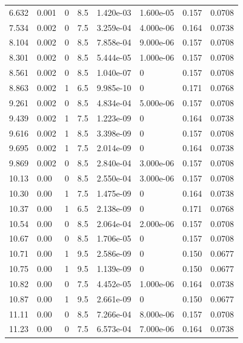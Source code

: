 \documentclass[preview]{standalone}
\begin{document}
{{\begin{tabular}{L{1.2cm}C{1.2cm} C{0.3cm}C{0.5cm} C{1.4cm}C{1.4cm} C{1.4cm}C{1.4cm}}
  6.632  &  0.001  & 0     & 8.5 &  1.420e-03  & 1.600e-05  & 0.157 &  0.0708   \\ 
  7.534  &  0.002  & 0     & 7.5 &  3.259e-04  & 4.000e-06  & 0.164 &  0.0738   \\ 
  8.104  &  0.002  & 0     & 8.5 &  7.858e-04  & 9.000e-06  & 0.157 &  0.0708   \\ 
  8.301  &  0.002  & 0     & 8.5 &  5.444e-05  & 1.000e-06  & 0.157 &  0.0708   \\ 
  8.561  &  0.002  & 0     & 8.5 &  1.040e-07  & 0  & 0.157 &  0.0708   \\ 
  8.863  &  0.002  & 1     & 6.5 &  9.985e-10  & 0  & 0.171 &  0.0768   \\ 
  9.261  &  0.002  & 0     & 8.5 &  4.834e-04  & 5.000e-06  & 0.157 &  0.0708   \\ 
  9.439  &  0.002  & 1     & 7.5 &  1.223e-09  & 0  & 0.164 &  0.0738   \\ 
  9.616  &  0.002  & 1     & 8.5 &  3.398e-09  & 0  & 0.157 &  0.0708   \\ 
  9.695  &  0.002  & 1     & 7.5 &  2.014e-09  & 0  & 0.164 &  0.0738   \\ 
  9.869  &  0.002  & 0     & 8.5 &  2.840e-04  & 3.000e-06  & 0.157 &  0.0708   \\ 
  10.13  &  0.00  & 0     & 8.5 &  2.550e-04  & 3.000e-06  & 0.157 &  0.0708   \\ 
  10.30  &  0.00  & 1     & 7.5 &  1.475e-09  & 0  & 0.164 &  0.0738   \\ 
  10.37  &  0.00  & 1     & 6.5 &  2.138e-09  & 0  & 0.171 &  0.0768   \\ 
  10.54  &  0.00  & 0     & 8.5 &  2.064e-04  & 2.000e-06  & 0.157 &  0.0708   \\ 
  10.67  &  0.00  & 0     & 8.5 &  1.706e-05  & 0  & 0.157 &  0.0708   \\ 
  10.71  &  0.00  & 1     & 9.5 &  2.586e-09  & 0  & 0.150 &  0.0677   \\ 
  10.75  &  0.00  & 1     & 9.5 &  1.139e-09  & 0  & 0.150 &  0.0677   \\ 
  10.82  &  0.00  & 0     & 7.5 &  4.452e-05  & 1.000e-06  & 0.164 &  0.0738   \\ 
  10.87  &  0.00  & 1     & 9.5 &  2.661e-09  & 0  & 0.150 &  0.0677   \\ 
  11.11  &  0.00  & 0     & 8.5 &  7.266e-04  & 8.000e-06  & 0.157 &  0.0708   \\ 
  11.23  &  0.00  & 0     & 7.5 &  6.573e-04  & 7.000e-06  & 0.164 &  0.0738   \\ 

\end{tabular}}}
\end{document}
